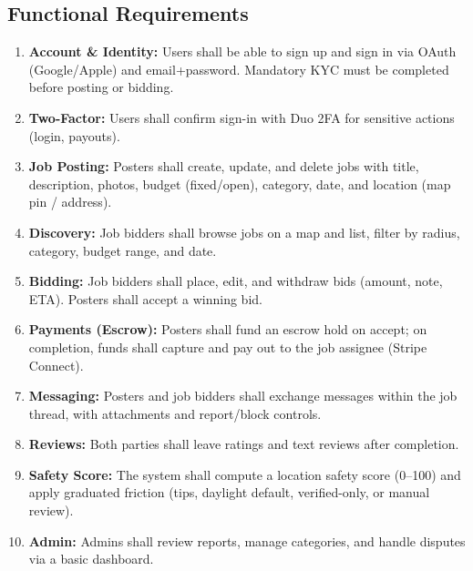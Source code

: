 \documentclass[11pt]{article}
\begin{document}
\subsection{Functional Requirements}
\begin{enumerate}[leftmargin=1.4em]
  \item \textbf{Account \& Identity:} Users shall be able to sign up and sign in via OAuth (Google/Apple) and email+password. Mandatory KYC must be completed before posting or bidding.
  \item \textbf{Two-Factor:} Users shall confirm sign-in with Duo 2FA for sensitive actions (login, payouts).
  \item \textbf{Job Posting:} Posters shall create, update, and delete jobs with title, description, photos, budget (fixed/open), category, date, and location (map pin / address).
  \item \textbf{Discovery:} Job bidders shall browse jobs on a map and list, filter by radius, category, budget range, and date.
  \item \textbf{Bidding:} Job bidders shall place, edit, and withdraw bids (amount, note, ETA). Posters shall accept a winning bid.
  \item \textbf{Payments (Escrow):} Posters shall fund an escrow hold on accept; on completion, funds shall capture and pay out to the job assignee (Stripe Connect).
  \item \textbf{Messaging:} Posters and job bidders shall exchange messages within the job thread, with attachments and report/block controls.
  \item \textbf{Reviews:} Both parties shall leave ratings and text reviews after completion.
  \item \textbf{Safety Score:} The system shall compute a location safety score (0--100) and apply graduated friction (tips, daylight default, verified-only, or manual review).
  \item \textbf{Admin:} Admins shall review reports, manage categories, and handle disputes via a basic dashboard.
\end{enumerate}
\end{document}
